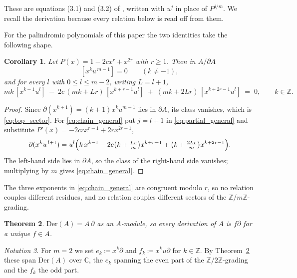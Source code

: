 \documentclass[11pt]{amsart}
\newtheorem{theorem}{Theorem}[section]
\newtheorem{corollary}[theorem]{Corollary}
\theoremstyle{definition}
\theoremstyle{remark}
\newtheorem{notation}[theorem]{Notation}
\newcommand{\C}{\mathbb{C}}
\newcommand{\Z}{\mathbb{Z}}
\newcommand{\Der}{\mathrm{Der}}
\newcommand{\pa}{\partial}
\begin{document}
These are equations (3.1) and (3.2) of \cite{CoxGuoLuZhao2017}, written with
$u^{j}$ in place of $P^{j/m}$. We recall the derivation because every relation
below is read off from them.


\noindent
For the palindromic polynomials of this paper the two identities take the
following shape.

\begin{corollary}\label{cor:chain_general}
Let $P(x)=1-2cx^{r}+x^{2r}$ with $r\geq1$. Then in $A/\pa A$
\begin{equation}\label{eq:top_sector}
  [x^{k}u^{\,m-1}] = 0 \qquad (k\neq-1),
\end{equation}
and for every $l$ with $0\leq l\leq m-2$, writing $L=l+1$,
\begin{equation}\label{eq:chain_general}
  mk\,[x^{k-1}u^{l}] \;-\; 2c\,(mk+Lr)\,[x^{k+r-1}u^{l}]
  \;+\; (mk+2Lr)\,[x^{k+2r-1}u^{l}] \;=\; 0,
  \qquad k\in\Z .
\end{equation}
\end{corollary}

\begin{proof}
Since $\pa(x^{k+1})=(k+1)x^ku^{m-1}$ lies in $\pa A$, its class vanishes, which
is \eqref{eq:top_sector}. For \eqref{eq:chain_general} put $j=l+1$ in
\eqref{eq:partial_general} and substitute $P'(x)=-2crx^{r-1}+2rx^{2r-1}$,
\[
  \pa(x^ku^{\,l+1}) = u^{l}\Bigl(k\,x^{k-1} - 2c\bigl(k+\tfrac{Lr}{m}\bigr)x^{k+r-1}
   + \bigl(k+\tfrac{2Lr}{m}\bigr)x^{k+2r-1}\Bigr) .
\]
The left-hand side lies in $\pa A$, so the class of the right-hand side
vanishes; multiplying by $m$ gives \eqref{eq:chain_general}.
\end{proof}

The three exponents in \eqref{eq:chain_general} are congruent modulo $r$, so no
relation couples different residues, and no relation couples different sectors
of the $\Z/m\Z$-grading.

\begin{theorem}\label{thm:der_module}
{\rm\cite[Lemma~3]{CoxGuoLuZhao2017}}
$\Der(A)=A\,\pa$ as an $A$-module, so every derivation of $A$ is $f\pa$ for a
unique $f\in A$.
\end{theorem}

\begin{notation}\label{not:basis}
For $m=2$ we set $e_k \coloneqq x^k\pa$ and $f_k \coloneqq x^k u\pa$ for
$k\in\Z$. By Theorem~\ref{thm:der_module} these span $\Der(A)$ over $\C$, the
$e_k$ spanning the even part of the $\Z/2\Z$-grading and the $f_k$ the odd
part.
\end{notation}
\end{document}
